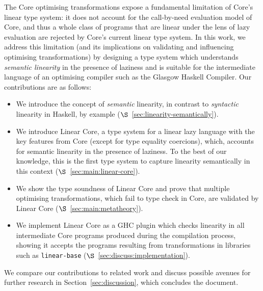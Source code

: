 \documentclass[acmsmall,review]{acmart}
\begin{document}

The Core optimising transformations expose a fundamental limitation of Core's
linear type system: it does not account for the call-by-need evaluation model
of Core, and thus a whole class of programs that are linear under the lens of
lazy evaluation are rejected by Core's current linear type system.
%
In this work, we address this limitation (and its implications on validating
and influencing optimising transformations) by designing a type system which
understands \emph{semantic linearity} in the presence of laziness and is suitable for
the intermediate language of an optimising compiler such as the
Glasgow Haskell Compiler.
%
Our contributions are as follows:
%
\begin{itemize}

\item We introduce the concept of \emph{semantic} linearity, in
contrast to \emph{syntactic} linearity in Haskell, by example
($\S$~\ref{sec:linearity-semantically}).

\item We introduce Linear Core, a type system for a linear lazy language with
the key features from Core (except for type equality coercions), which,
accounts for semantic linearity in the presence of laziness. To the
best of our knowledge, this is the first type system to capture linearity
semantically in this context
($\S$~\ref{sec:main:linear-core}).

\item We show the type soundness of Linear Core and prove that
  multiple optimising transformations, which
fail to type check in Core, are validated by Linear
Core ($\S$~\ref{sec:main:metatheory}).

\item We implement Linear Core as a GHC plugin which checks linearity in
all intermediate Core programs produced during the compilation process, showing
it accepts the programs resulting from transformations in libraries such as
\texttt{linear-base} ($\S$~\ref{sec:discuss:implementation}).

\end{itemize}
%
%
We compare our contributions to related work and discuss possible
avenues for further research
in Section~\ref{sec:discussion}, which concludes the document.
\end{document}
